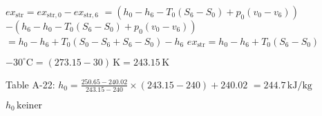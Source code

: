 \( ex_{\text{str}} = ex_{\text{str},0} - ex_{\text{str},6} \)  
\( = (h_0 - h_6 - T_0(S_6 - S_0) + p_0(v_0 - v_6)) \)  
\( - (h_6 - h_0 - T_0(S_6 - S_0) + p_0(v_0 - v_6)) \)  
\( = h_0 - h_6 + T_0(S_0 - S_6 + S_6 - S_0) - h_6 \)  
\( ex_{\text{str}} = h_0 - h_6 + T_0(S_6 - S_0) \)  

\( -30^\circ \text{C} = (273.15 - 30) \, \text{K} = 243.15 \, \text{K} \)  

Table A-22:  
\( h_0 = \frac{250.65 - 240.02}{243.15 - 240} \times (243.15 - 240) + 240.02 \)  
\( = 244.7 \, \text{kJ/kg} \)  

\( h_0 \, \text{keiner} \)